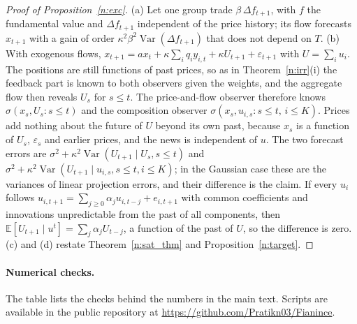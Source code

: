 \begin{proof}[Proof of Proposition~\ref{n:exc}]
(a) Let one group trade $\beta\,\Delta f_{t+1}$, with $f$ the fundamental value and $\Delta f_{t+1}$ independent of the price history; its flow forecasts $x_{t+1}$ with a gain of order $\kappa^2\beta^2\operatorname{Var}(\Delta f_{t+1})$ that does not depend on $T$. (b) With exogenous flows, $x_{t+1}=ax_t+\kappa\sum_iq_iy_{i,t}+\kappa U_{t+1}+\varepsilon_{t+1}$ with $U=\sum_iu_i$. The positions are still functions of past prices, so as in Theorem~\ref{n:irr}(i) the feedback part is known to both observers given the weights, and the aggregate flow then reveals $U_s$ for $s\le t$. The price-and-flow observer therefore knows $\sigma(x_s,U_s:s\le t)$ and the composition observer $\sigma(x_s,u_{i,s}:s\le t,\,i\le K)$. Prices add nothing about the future of $U$ beyond its own past, because $x_s$ is a function of $U_s$, $\varepsilon_s$ and earlier prices, and the news is independent of $u$. The two forecast errors are $\sigma^2+\kappa^2\operatorname{Var}(U_{t+1}\mid U_s,s\le t)$ and $\sigma^2+\kappa^2\operatorname{Var}(U_{t+1}\mid u_{i,s},s\le t,i\le K)$; in the Gaussian case these are the variances of linear projection errors, and their difference is the claim. If every $u_i$ follows $u_{i,t+1}=\sum_{j\ge0}\alpha_ju_{i,t-j}+e_{i,t+1}$ with common coefficients and innovations unpredictable from the past of all components, then $\mathbb E[U_{t+1}\mid u^t]=\sum_j\alpha_jU_{t-j}$, a function of the past of $U$, so the difference is zero. (c) and (d) restate Theorem~\ref{n:sat_thm} and Proposition~\ref{n:target}.
\end{proof}

\paragraph{Numerical checks.} The table lists the checks behind the numbers in the main text. Scripts are available in the public repository at \url{https://github.com/Pratikn03/Fianince}.

